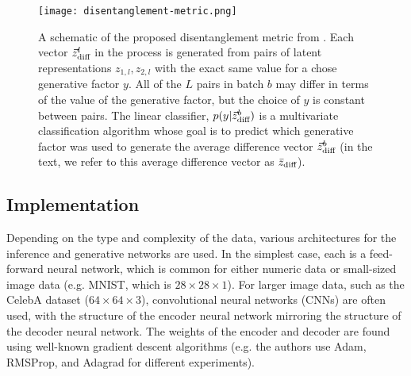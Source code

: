 \begin{figure}
    \texttt{[image: disentanglement-metric.png]}
    \caption{A schematic of the proposed disentanglement metric from \cite{higgins2016beta}. Each vector $\vec{z}^l_{\text{diff}}$ in the process is generated from pairs of latent representations $z_{1,l}, z_{2,l}$ with the exact same value for a chose generative factor $y$. All of the $L$ pairs in batch $b$ may differ in terms of the value of the generative factor, but the choice of $y$ is constant between pairs. The linear classifier, $p(y|\vec{z}^b_{\text{diff}})$ is a multivariate classification algorithm whose goal is to predict which generative factor was used to generate the average difference vector $\vec{z}_{\text{diff}}^b$ (in the text, we refer to this average difference vector as $\bar{z}_{\text{diff}}$).}
    \label{fig:disentanglement-metric}
\end{figure}

\subsection{Implementation}

Depending on the type and complexity of the data, various architectures for the inference and generative networks are used. In the simplest case, each is a feed-forward neural network, which is common for either numeric data or small-sized image data (e.g. MNIST, which is $28\times28\times1$). For larger image data, such as the CelebA dataset ($64\times64\times3$), convolutional neural networks (CNNs) are often used, with the structure of the encoder neural network mirroring the structure of the decoder neural network. The weights of the encoder and decoder are found using well-known gradient descent algorithms (e.g. the authors use Adam, RMSProp, and Adagrad for different experiments).